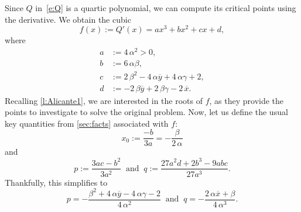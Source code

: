 \documentclass[11pt]{article}
\newcommand{\px}{\overline{x}}
\newcommand{\py}{\overline{y}}
\begin{document}
Since $Q$ in~\cref{e:Q} is a quartic polynomial, we can compute its critical points using the derivative. We obtain the cubic
\begin{equation}\label{e:f}
f(x) := Q'(x) = ax^3 + bx^2 + cx+ d,
\end{equation}
where
\begin{align*}
a &:= 4 \, \alpha^{2} > 0, \\
b &:= 6 \, \alpha \beta, \\
c &:= 2 \, \beta^{2} - 4 \, \alpha \py + 4 \, \alpha \gamma + 2, \\
d &:= -2 \, \beta \py + 2 \, \beta \gamma - 2 \, \px.
\end{align*}
Recalling \cref{l:Alicante1}, we are interested in the roots of $f$, as they provide the 
points to investigate to solve the original problem. 
Now, let us define the usual key quantities from \cref{sec:facts} associated with $f$: 
\begin{equation*}
x_0 := \frac{-b}{3a} = -\frac{\beta}{2 \, \alpha}
\end{equation*}
and 
\begin{equation*}
\label{e:240622a}
p := \frac{3ac-b^2}{3a^2}
\;\;\text{and}\;\; q := \frac{27a^2d+2b^3-9abc}{27a^3}. 
\end{equation*}
Thankfully, this simplifies to
\begin{equation}\label{e:p}
p = -\frac{\beta^{2} + 4 \, \alpha \py - 4 \, \alpha \gamma - 2}{4 \, \alpha^{2}}\;\;\text{and}\;\; q = -\frac{2 \, \alpha \px + \beta}{4 \, \alpha^{3}}.
\end{equation}
\end{document}
